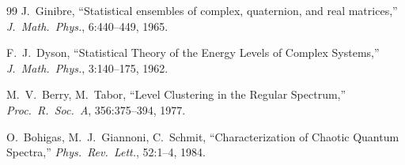 \documentclass[12pt,a4paper]{article}
\theoremstyle{definition}
\theoremstyle{remark}
\begin{document}
\begin{thebibliography}{99}
 J.~Ginibre, ``Statistical ensembles of complex,
  quaternion, and real matrices,'' \emph{J.\ Math.\ Phys.}, 6:440--449, 1965.

 F.~J.~Dyson, ``Statistical Theory of the Energy Levels of
  Complex Systems,'' \emph{J.\ Math.\ Phys.}, 3:140--175, 1962.

 M.~V.~Berry, M.~Tabor, ``Level Clustering in the
  Regular Spectrum,'' \emph{Proc.\ R.\ Soc.\ A}, 356:375--394, 1977.

 O.~Bohigas, M.~J.~Giannoni, C.~Schmit, ``Characterization
  of Chaotic Quantum Spectra,'' \emph{Phys.\ Rev.\ Lett.}, 52:1--4, 1984.

\end{thebibliography}
\end{document}
